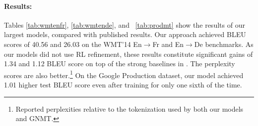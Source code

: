 \documentclass{article} %
\begin{document}
\begin{table}[h!]
\caption{Results on WMT'14 En $\rightarrow$ De newstest2014 (bold values represent best results).}
\label{tab:wmtende}
\begin{center}
\vspace{-5pt}
\end{center}
\end{table}

\begin{table}[h!]
\caption{Results on the Google Production En$\rightarrow$ Fr dataset (bold values represent best results).}
\label{tab:prodmt}
\begin{center}
\vspace{-5pt}
\end{center}
\end{table}

\paragraph{Results:} Tables \ref{tab:wmtenfr}, \ref{tab:wmtende}, and ~\ref{tab:prodmt} show the results of our largest models, compared with published results.  Our approach achieved BLEU scores of 40.56 and 26.03 on the  WMT'14 En$\rightarrow$Fr and En$\rightarrow$De benchmarks. As our models did not use RL refinement, these results constitute significant gains of 1.34 and 1.12 BLEU score on top of the strong baselines in \citep{GNMT}. The perplexity scores are also better.\footnote{Reported perplexities relative to the tokenization used by both our models and GNMT.} On the Google Production dataset, our model achieved 1.01 higher test BLEU score even after training for only one sixth of the time.
\end{document}
